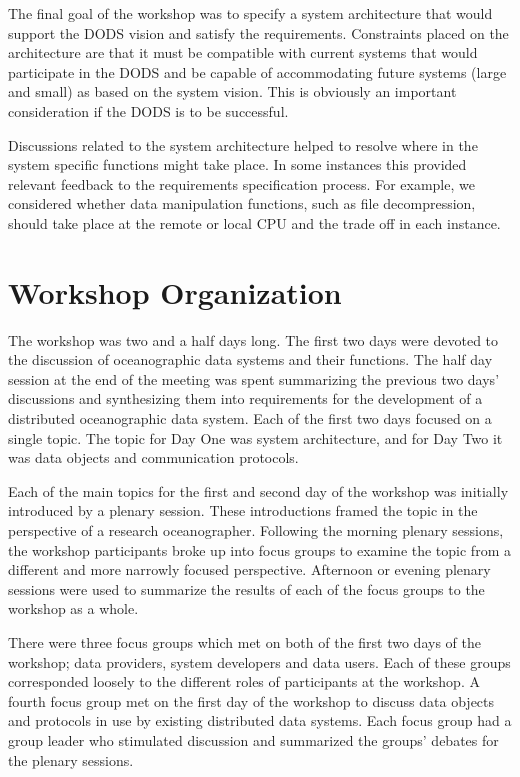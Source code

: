 The final goal of the workshop was to specify a system architecture that
would support the DODS vision and satisfy the requirements. Constraints
placed on the architecture are that it must be compatible with current
systems that would participate in the DODS and be capable of accommodating
future systems (large and small) as based on the system vision. This is
obviously an important consideration if the DODS is to be successful.

Discussions related to the system architecture helped to resolve where in the
system specific functions might take place. In some instances this provided
relevant feedback to the requirements specification process. For example, we
considered whether data manipulation functions, such as file decompression,
should take place at the remote or local CPU and the trade off in each
instance.

\section{\bf Workshop Organization}

The workshop was two and a half days long. The first two days were devoted to
the discussion of oceanographic data systems and their functions. The half
day session at the end of the meeting was spent summarizing the previous two
days' discussions and synthesizing them into requirements for the development
of a distributed oceanographic data system. Each of the first two days
focused on a single topic. The topic for Day One was system architecture,
and for Day Two it was data objects and communication protocols.

Each of the main topics for the first and second day of the workshop was
initially introduced by a plenary session. These introductions framed the
topic in the perspective of a research oceanographer. Following the morning
plenary sessions, the workshop participants broke up into focus groups to
examine the topic from a different and more narrowly focused perspective.
Afternoon or evening plenary sessions were used to summarize the results of
each of the focus groups to the workshop as a whole.

There were three focus groups which met on both of the first two days of the
workshop; data providers, system developers and data users. Each of these
groups corresponded loosely to the different roles of participants at the
workshop. A fourth focus group met on the first day of the workshop to
discuss data objects and protocols in use by existing distributed data
systems. Each focus group had a group leader who stimulated discussion and
summarized the groups' debates for the plenary sessions.

